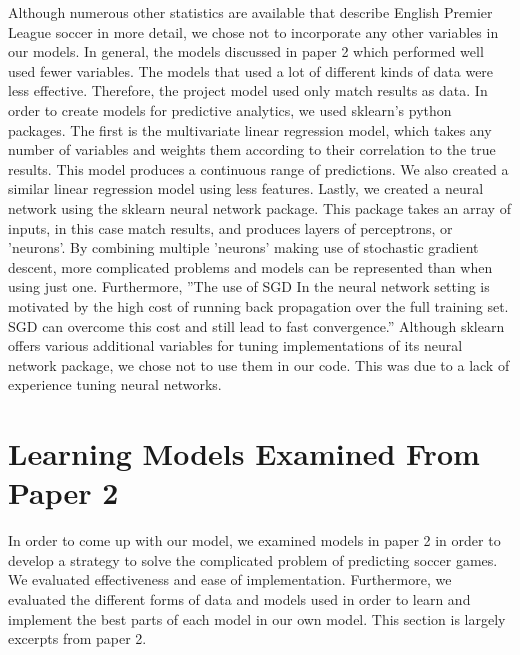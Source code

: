 \documentclass[sigconf]{acmart}
\begin{document}
Although numerous other statistics are available that describe English Premier League soccer in more detail, we chose not to incorporate any other variables in our models. In general, the models discussed in paper 2 which performed well used fewer variables. The models that used a lot of different kinds of data were less effective. Therefore, the project model used only match results as data. 
In order to create models for predictive analytics, we used sklearn's python packages. The first is the multivariate linear regression model, which takes any number of variables and weights them according to their correlation to the true results. This model produces a continuous range of predictions. We also created a similar linear regression model using less features. Lastly, we created a neural network using the sklearn neural network package. This package takes an array of inputs, in this case match results, and produces layers of perceptrons, or 'neurons'. By combining multiple 'neurons' making use of stochastic gradient descent, more complicated problems and models can be represented than when using just one. Furthermore, ''The use of SGD In the neural network setting is motivated by the high cost of running back propagation over the full training set. SGD can overcome this cost and still lead to fast convergence.''\cite{StanfordSGD} Although sklearn offers various additional variables for tuning implementations of its neural network package, we chose not to use them in our code. This was due to a lack of experience tuning neural networks.

\section{Learning Models Examined From Paper 2}
In order to come up with our model, we examined models in paper 2 in order to develop a strategy to solve the complicated problem of predicting soccer games. We evaluated effectiveness and ease of implementation. Furthermore, we evaluated the different forms of data and models used in order to learn and implement the best parts of each model in our own model. This section is largely excerpts from paper 2.
\end{document}
